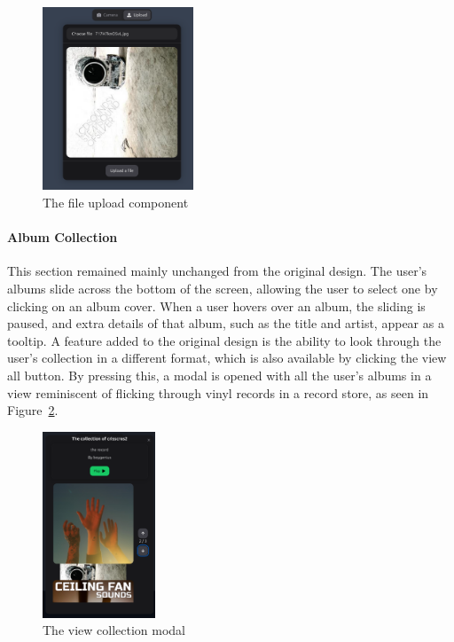 \begin{figure} [H]
    \centering
    \includegraphics[width=0.4\textwidth]{figures/upload_component.png}
    \caption{The file upload component}
    \label{fig:upload_component}
\end{figure}

\paragraph{Album Collection}
This section remained mainly unchanged from the original design. The user's albums slide across the bottom of the screen, allowing the user to select one by clicking on an album cover. When a user hovers over an album, the sliding is paused, and extra details of that album, such as the title and artist, appear as a tooltip.
A feature added to the original design is the ability to look through the user's collection in a different format, which is also available by clicking the view all button. By pressing this, a modal is opened with all the user's albums in a view reminiscent of flicking through vinyl records in a record store, as seen in Figure~\ref{fig:collection_flick_through}.

\begin{figure} [H]
    \centering
    \includegraphics[width=0.3\textwidth]{figures/collection_flick_through.png}
    \caption{The view collection modal}
    \label{fig:collection_flick_through}
\end{figure}

